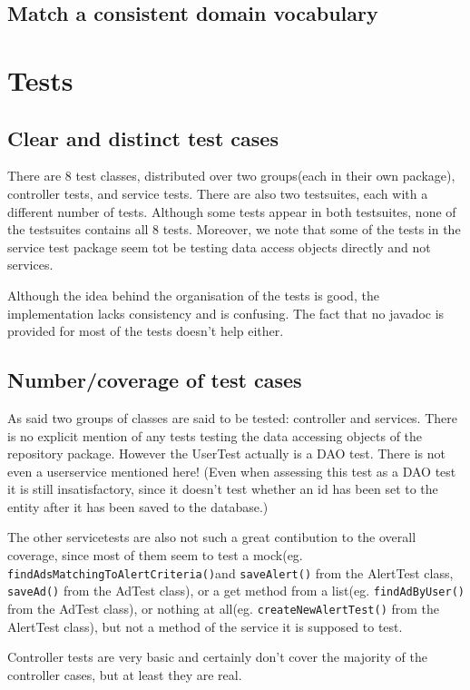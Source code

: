 \documentclass[a4wide]{article}
\begin{document}
\subsection{Match a consistent domain vocabulary}
\section{Tests}
\subsection{Clear and distinct test cases}
There are 8 test classes, distributed over two groups(each in their own package), controller tests, and service tests. There are also two testsuites, each with a different number of tests. Although some tests appear in both testsuites, none of the testsuites contains all 8 tests. Moreover, we note that some of the tests in the service test package seem tot be testing data access objects directly and not services. 

Although the idea behind the organisation of the tests is good, the implementation lacks consistency and is confusing. The fact that no javadoc is provided for most of the tests doesn't help either. 
\subsection{Number/coverage of test cases}
As said two groups of classes are said to be tested: controller and services. There is no explicit mention of any tests testing the data accessing objects of the repository package. However the UserTest actually is a DAO test. There is not even a userservice mentioned here! (Even when assessing this test as a DAO test it is still insatisfactory, since it doesn't test whether an id has been set to the entity after it has been saved to the database.)

The other servicetests are also not such a great contibution to the overall coverage, since most of them seem to test a mock(eg. \texttt{findAdsMatchingToAlertCriteria()}and \texttt{saveAlert()} from the AlertTest class, \texttt{saveAd()} from the AdTest class), or a get method from a list(eg. \texttt{findAdByUser()} from the AdTest class), or nothing at all(eg. \texttt{createNewAlertTest()} from the AlertTest class), but not a method of the service it is supposed to test. 

Controller tests are very basic and certainly don't cover the majority of the controller cases, but at least they are real. 
\end{document}
